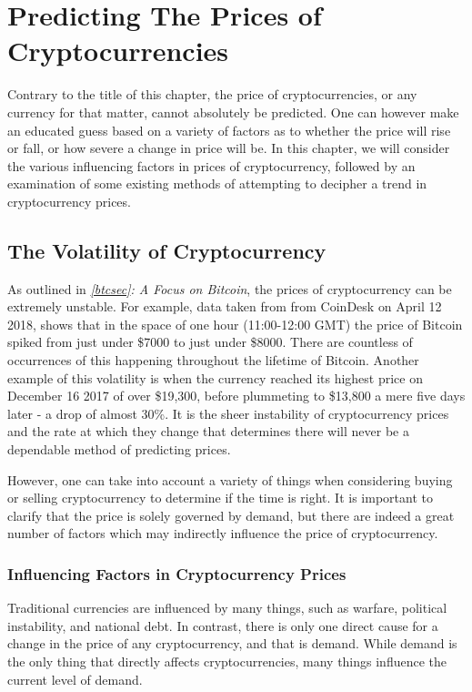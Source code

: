 \chapter{Predicting The Prices of Cryptocurrencies}\label{predictingpricesch}

Contrary to the title of this chapter, the price of cryptocurrencies, or any currency for that matter, cannot absolutely be predicted. One can however make an educated guess based on a variety of factors as to whether the price will rise or fall, or how severe a change in price will be. In this chapter, we will consider the various influencing factors in prices of cryptocurrency, followed by an examination of some existing methods of attempting to decipher a trend in cryptocurrency prices.

\section{The Volatility of Cryptocurrency}
As outlined in \textit{\ref{btcsec}: A Focus on Bitcoin}, the prices of cryptocurrency can be extremely unstable. For example, data taken from from CoinDesk \cite{coindeskprices} on April 12 2018, shows that in the space of one hour (11:00-12:00 GMT) the price of Bitcoin spiked from just under \$7000 to just under \$8000. There are countless of occurrences of this happening throughout the lifetime of Bitcoin. Another example of this volatility is when the currency reached its highest price on December 16 2017 of over \$19,300, before plummeting to \$13,800 a mere five days later - a drop of almost 30\%. It is the sheer instability of cryptocurrency prices and the rate at which they change that determines there will never be a dependable method of predicting prices.

However, one can take into account a variety of things when considering buying or selling cryptocurrency to determine if the time is right. It is important to clarify that the price is solely governed by demand, but there are indeed a great number of factors which may indirectly influence the price of cryptocurrency.

\subsection{Influencing Factors in Cryptocurrency Prices}\label{secinfluenceprices}
Traditional currencies are influenced by many things, such as warfare, political instability, and national debt. In contrast, there is only one direct cause for a change in the price of any cryptocurrency, and that is demand. While demand is the only thing that directly affects cryptocurrencies, many things influence the current level of demand.

